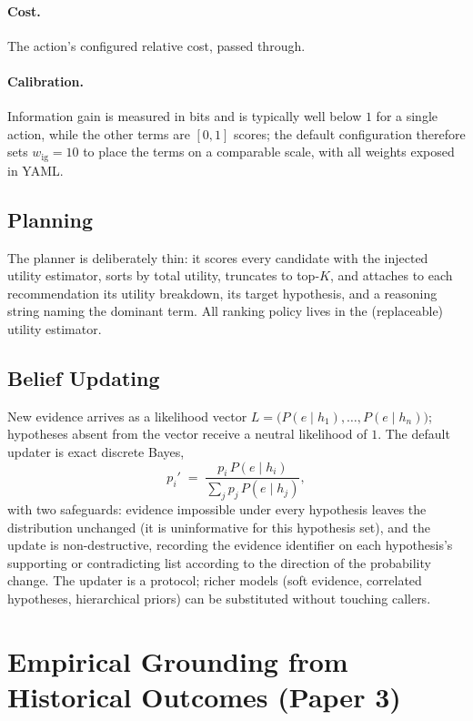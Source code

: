 \documentclass[11pt]{article}
\begin{document}
\paragraph{Cost.}
The action's configured relative cost, passed through.

\paragraph{Calibration.}
Information gain is measured in bits and is typically well below $1$ for
a single action, while the other terms are $[0,1]$ scores; the default
configuration therefore sets $w_{\mathrm{ig}} = 10$ to place the terms on
a comparable scale, with all weights exposed in YAML.

\subsection{Planning}

The planner is deliberately thin: it scores every candidate with the
injected utility estimator, sorts by total utility, truncates to
top-$K$, and attaches to each recommendation its utility breakdown, its
target hypothesis, and a reasoning string naming the dominant term. All
ranking policy lives in the (replaceable) utility estimator.

\subsection{Belief Updating}

New evidence arrives as a likelihood vector
$L = \big(P(e \mid h_1), \dots, P(e \mid h_n)\big)$; hypotheses absent
from the vector receive a neutral likelihood of $1$. The default updater
is exact discrete Bayes,
\begin{equation}
p_i' \;=\; \frac{p_i\, P(e \mid h_i)}{\sum_j p_j\, P(e \mid h_j)},
\end{equation}
with two safeguards: evidence impossible under every hypothesis leaves
the distribution unchanged (it is uninformative for this hypothesis
set), and the update is non-destructive, recording the evidence
identifier on each hypothesis's supporting or contradicting list
according to the direction of the probability change. The updater is a
protocol; richer models (soft evidence, correlated hypotheses,
hierarchical priors) can be substituted without touching callers.

\section{Empirical Grounding from Historical Outcomes (Paper 3)}
\label{sec:grounding}
\end{document}
